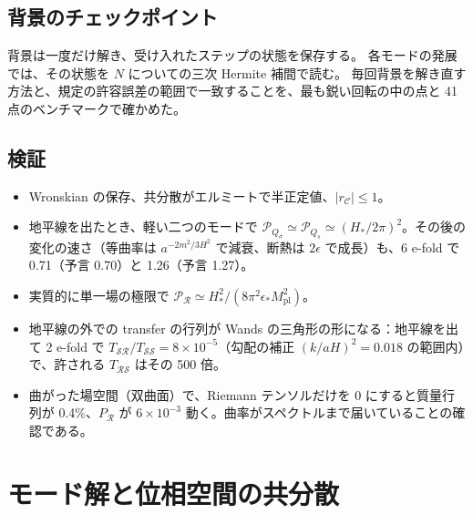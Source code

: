 \documentclass[a4paper,11pt]{ltjsarticle}
\newcommand{\Mpl}{M_{\mathrm{pl}}}
\begin{document}
\subsection{背景のチェックポイント}
背景は一度だけ解き、受け入れたステップの状態を保存する。
各モードの発展では、その状態を $N$ についての三次 Hermite 補間で読む。
毎回背景を解き直す方法と、規定の許容誤差の範囲で一致することを、最も鋭い回転の中の点と 41 点のベンチマークで確かめた。

\subsection{検証}
\begin{itemize}
\item Wronskian の保存、共分散がエルミートで半正定値、$|r_{\mathcal C}|\leq1$。
\item 地平線を出たとき、軽い二つのモードで $\mathcal P_{Q_\sigma}\simeq\mathcal P_{Q_s}\simeq(H_*/2\pi)^2$。その後の変化の速さ（等曲率は $a^{-2m^2/3H^2}$ で減衰、断熱は $2\epsilon$ で成長）も、6 e-fold で 0.71（予言 0.70）と 1.26（予言 1.27）。
\item 実質的に単一場の極限で $\mathcal P_{\mathcal R}\simeq H_*^2/(8\pi^2\epsilon_*\Mpl^2)$。
\item 地平線の外での transfer の行列が Wands の三角形の形\cite{Wands2002}になる：地平線を出て 2 e-fold で $T_{\mathcal{SR}}/T_{\mathcal{SS}}=8\times10^{-5}$（勾配の補正 $(k/aH)^2=0.018$ の範囲内）で、許される $T_{\mathcal{RS}}$ はその 500 倍。
\item 曲がった場空間（双曲面）で、Riemann テンソルだけを 0 にすると質量行列が 0.4\%、$P_{\mathcal R}$ が $6\times10^{-3}$ 動く。曲率がスペクトルまで届いていることの確認である。
\end{itemize}

\section{モード解と位相空間の共分散}
\label{app:oracle}
\end{document}

